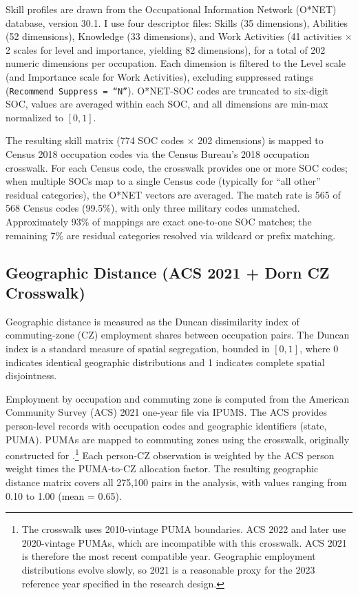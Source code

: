 \documentclass[12pt]{article}
\begin{document}
Skill profiles are drawn from the Occupational Information Network (O*NET) database, version 30.1. I use four descriptor files: Skills (35 dimensions), Abilities (52 dimensions), Knowledge (33 dimensions), and Work Activities (41 activities $\times$ 2 scales for level and importance, yielding 82 dimensions), for a total of 202 numeric dimensions per occupation. Each dimension is filtered to the Level scale (and Importance scale for Work Activities), excluding suppressed ratings (\texttt{Recommend Suppress = ``N''}). O*NET-SOC codes are truncated to six-digit SOC, values are averaged within each SOC, and all dimensions are min-max normalized to $[0,1]$.

The resulting skill matrix (774 SOC codes $\times$ 202 dimensions) is mapped to Census 2018 occupation codes via the Census Bureau's 2018 occupation crosswalk. For each Census code, the crosswalk provides one or more SOC codes; when multiple SOCs map to a single Census code (typically for ``all other'' residual categories), the O*NET vectors are averaged. The match rate is 565 of 568 Census codes (99.5\%), with only three military codes unmatched. Approximately 93\% of mappings are exact one-to-one SOC matches; the remaining 7\% are residual categories resolved via wildcard or prefix matching.

\subsection{Geographic Distance (ACS 2021 + Dorn CZ Crosswalk)}
\label{sec:data_geo}

Geographic distance is measured as the Duncan dissimilarity index of commuting-zone (CZ) employment shares between occupation pairs. The Duncan index is a standard measure of spatial segregation, bounded in $[0,1]$, where 0 indicates identical geographic distributions and 1 indicates complete spatial disjointness.

Employment by occupation and commuting zone is computed from the American Community Survey (ACS) 2021 one-year file via IPUMS. The ACS provides person-level records with occupation codes and geographic identifiers (state, PUMA). PUMAs are mapped to commuting zones using the \citet{dorn2009} crosswalk, originally constructed for \citet{autor2013}.\footnote{The crosswalk uses 2010-vintage PUMA boundaries. ACS 2022 and later use 2020-vintage PUMAs, which are incompatible with this crosswalk. ACS 2021 is therefore the most recent compatible year. Geographic employment distributions evolve slowly, so 2021 is a reasonable proxy for the 2023 reference year specified in the research design.} Each person-CZ observation is weighted by the ACS person weight times the PUMA-to-CZ allocation factor. The resulting geographic distance matrix covers all 275,100 pairs in the analysis, with values ranging from 0.10 to 1.00 (mean = 0.65).
\end{document}

